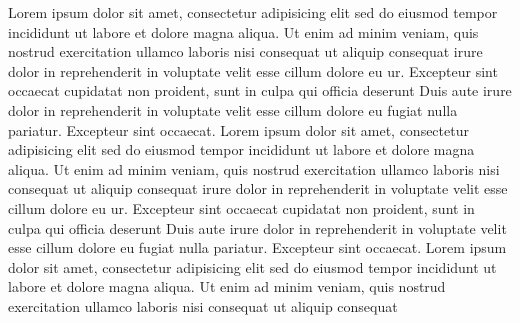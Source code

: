 \documentclass[a4paper, oneside, notitlepage, 12pt]{article}
\begin{document}
\begin{pages}
\begin{Rightside}
\beginnumbering
{}
Lorem ipsum dolor sit amet, consectetur adipisicing elit
sed do eiusmod tempor incididunt ut labore et dolore
magna aliqua. Ut enim ad minim veniam, quis nostrud
exercitation ullamco laboris nisi
 consequat ut aliquip consequat\pend[\vskip 2ex]
 irure dolor in reprehenderit
in voluptate velit esse cillum dolore eu ur. Excepteur sint occaecat
cupidatat non proident, sunt in culpa qui officia deserunt
Duis aute irure dolor in reprehenderit
in voluptate velit esse cillum dolore eu fugiat nulla
pariatur. Excepteur sint occaecat.
\pend
{}
Lorem ipsum dolor sit amet, consectetur adipisicing elit
sed do eiusmod tempor incididunt ut labore et dolore
magna aliqua. Ut enim ad minim veniam, quis nostrud
exercitation ullamco laboris nisi
 consequat ut aliquip consequat\pend[\vskip 2ex]
 irure dolor in reprehenderit
in voluptate velit esse cillum dolore eu ur. Excepteur sint occaecat
cupidatat non proident, sunt in culpa qui officia deserunt
Duis aute irure dolor in reprehenderit
in voluptate velit esse cillum dolore eu fugiat nulla
pariatur. Excepteur sint occaecat.
\pend
{}
Lorem ipsum dolor sit amet, consectetur adipisicing elit
sed do eiusmod tempor incididunt ut labore et dolore
magna aliqua. Ut enim ad minim veniam, quis nostrud
exercitation ullamco laboris nisi
 consequat ut aliquip consequat\pend[\vskip 2ex]

\end{Rightside}
\end{pages}
\end{document}

